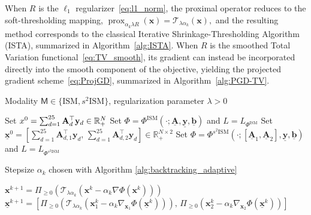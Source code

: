 \documentclass[letterpaper]{article}
\newcommand{\x}{\mathbf{x}}
\begin{document}
When $R$ is the $\ell_1$ regularizer~\eqref{eq:l1_norm}, the proximal operator reduces to the soft-thresholding mapping,
$
\operatorname{prox}_{\alpha_k\lambda R}(\x)
=
\mathcal T_{\lambda\alpha_k}(\x),
$
and the resulting method corresponds to the classical Iterative Shrinkage-Thresholding Algorithm (ISTA), summarized in Algorithm~\ref{alg:ISTA}.  When $R$ is the smoothed Total Variation functional~\eqref{eq:TV_smooth}, its gradient can instead be incorporated directly into the smooth component of the objective, yielding the projected gradient scheme~\eqref{eq:ProjGD}, summarized in Algorithm~\ref{alg:PGD-TV}.

\begin{algorithm}
\caption{Iterative Shrinkage-Thresholding Algorithm (ISTA) for ISM and $s^2$ISM}
\label{alg:ISTA}
\begin{algorithmic}[1]
\Require Modality $\mathsf{M}\in\{\mathrm{ISM},s^2\mathrm{ISM}\}$, regularization parameter $\lambda>0$

    \State Set $\mathbf \x^0=\sum_{d=1}^{25}\mathbf A_d^\top \mathbf y_d \in \mathbb R_+^N$
    \State Set $\Phi=\Phi^{\mathrm{ISM}}(\cdot;\underline{\mathbf A},\underline{\mathbf y},\underline{\mathbf b})$ and $L=L_{\Phi^{\mathrm{ISM}}}$
    \State Set $\underline{\mathbf x}^0=
    \left[
    \sum_{d=1}^{25}\mathbf A_{d,1}^\top\mathbf y_d,\,
    \sum_{d=1}^{25}\mathbf A_{d,2}^\top\mathbf y_d
    \right]\in\mathbb R_+^{N\times2}$
    \State Set $\Phi=\Phi^{s^2\mathrm{ISM}}(\cdot;[\underline{\mathbf A}_1,\underline{\mathbf A}_2],\underline{\mathbf y},\underline{\mathbf b})$ and $L=L_{\Phi^{s^2\mathrm{ISM}}}$
\EndIf

\Require Stepsize $\alpha_k$ chosen with Algorithm \ref{alg:backtracking_adaptive}

        \State $\mathbf{x}^{k+1}
        =
        \Pi_{\geq0}\!\left(
        \mathcal T_{\lambda\alpha_k}
        \left(
        \mathbf{x}^k
        -
        \alpha_k\nabla\Phi(\mathbf{x}^k)
        \right)
        \right)$
        \State $\underline{\mathbf{x}}^{k+1}
        =
        \left[
        \Pi_{\geq0}\!\left(
        \mathcal T_{\lambda\alpha_k}
        \left(
        \mathbf{x}_1^k
        -
        \alpha_k
        \nabla_{\mathbf{x}_1}\Phi(\underline{\mathbf{x}}^k)
        \right)
        \right),
        \,
        \Pi_{\geq0}\!\left(
        \mathbf{x}_2^k
        -
        \alpha_k
        \nabla_{\mathbf{x}_2}\Phi(\underline{\mathbf{x}}^k)
        \right)
        \right]
        $
    \EndIf
\EndFor
\end{algorithmic}
\end{algorithm}
\end{document}
